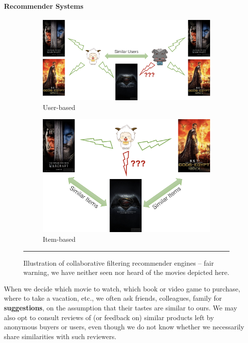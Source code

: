 \paragraph{Recommender Systems}
\begin{figure}[!t]
\centering
\begin{subfigure}[c]{0.48\textwidth}
\centering\includegraphics[height=0.15\textheight]{images/DSML/RS1.png}
\caption{\small User-based}\label{fig:RE1}
\end{subfigure}
\begin{subfigure}[c]{0.48\textwidth}
\centering\includegraphics[height=0.15\textheight]{images/DSML/RS2.png}
\caption{\small Item-based}\label{fig:RE2}
\end{subfigure}
\caption[\small Illustration of collaborative filtering recommender engines]{\small Illustration of collaborative filtering recommender engines -- fair warning, we have neither seen nor heard of the movies depicted here.}\hrule\label{fig:RE}\end{figure}
When we decide which movie to watch, which book or video game to purchase, where to take a vacation, etc., we often ask friends, colleagues, family for \textbf{suggestions}, on the assumption that their tastes are similar to ours. We may also opt to consult reviews of (or feedback on) similar products left by anonymous buyers or users, even though we do not know whether we necessarily share similarities with such reviewers. \newl 
